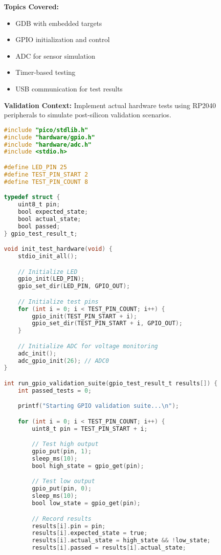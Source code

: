 \documentclass[11pt,a4paper]{article}
\begin{document}
\textbf{Topics Covered:}
\begin{itemize}
    \item GDB with embedded targets
    \item GPIO initialization and control
    \item ADC for sensor simulation
    \item Timer-based testing
    \item USB communication for test results
\end{itemize}

\textbf{Validation Context:}
Implement actual hardware tests using RP2040 peripherals to simulate post-silicon validation scenarios.

\begin{lstlisting}[language=C, caption=Day 5 Example: GPIO Validation Test]
#include "pico/stdlib.h"
#include "hardware/gpio.h"
#include "hardware/adc.h"
#include <stdio.h>

#define LED_PIN 25
#define TEST_PIN_START 2
#define TEST_PIN_COUNT 8

typedef struct {
    uint8_t pin;
    bool expected_state;
    bool actual_state;
    bool passed;
} gpio_test_result_t;

void init_test_hardware(void) {
    stdio_init_all();

    // Initialize LED
    gpio_init(LED_PIN);
    gpio_set_dir(LED_PIN, GPIO_OUT);

    // Initialize test pins
    for (int i = 0; i < TEST_PIN_COUNT; i++) {
        gpio_init(TEST_PIN_START + i);
        gpio_set_dir(TEST_PIN_START + i, GPIO_OUT);
    }

    // Initialize ADC for voltage monitoring
    adc_init();
    adc_gpio_init(26); // ADC0
}

int run_gpio_validation_suite(gpio_test_result_t results[]) {
    int passed_tests = 0;

    printf("Starting GPIO validation suite...\n");

    for (int i = 0; i < TEST_PIN_COUNT; i++) {
        uint8_t pin = TEST_PIN_START + i;

        // Test high output
        gpio_put(pin, 1);
        sleep_ms(10);
        bool high_state = gpio_get(pin);

        // Test low output
        gpio_put(pin, 0);
        sleep_ms(10);
        bool low_state = gpio_get(pin);

        // Record results
        results[i].pin = pin;
        results[i].expected_state = true;
        results[i].actual_state = high_state && !low_state;
        results[i].passed = results[i].actual_state;


\end{lstlisting}
\end{document}
